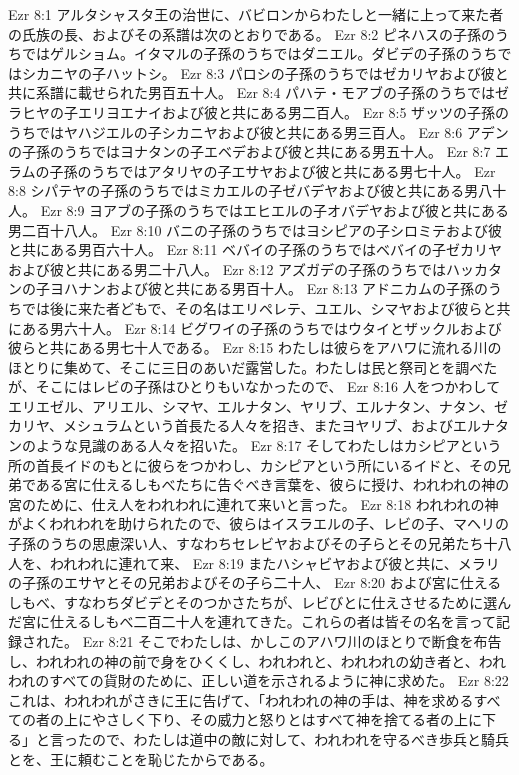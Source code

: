 Ezr 8:1  アルタシャスタ王の治世に、バビロンからわたしと一緒に上って来た者の氏族の長、およびその系譜は次のとおりである。
Ezr 8:2  ピネハスの子孫のうちではゲルショム。イタマルの子孫のうちではダニエル。ダビデの子孫のうちではシカニヤの子ハットシ。
Ezr 8:3  パロシの子孫のうちではゼカリヤおよび彼と共に系譜に載せられた男百五十人。
Ezr 8:4  パハテ・モアブの子孫のうちではゼラヒヤの子エリヨエナイおよび彼と共にある男二百人。
Ezr 8:5  ザッツの子孫のうちではヤハジエルの子シカニヤおよび彼と共にある男三百人。
Ezr 8:6  アデンの子孫のうちではヨナタンの子エベデおよび彼と共にある男五十人。
Ezr 8:7  エラムの子孫のうちではアタリヤの子エサヤおよび彼と共にある男七十人。
Ezr 8:8  シパテヤの子孫のうちではミカエルの子ゼバデヤおよび彼と共にある男八十人。
Ezr 8:9  ヨアブの子孫のうちではエヒエルの子オバデヤおよび彼と共にある男二百十八人。
Ezr 8:10  バニの子孫のうちではヨシピアの子シロミテおよび彼と共にある男百六十人。
Ezr 8:11  ベバイの子孫のうちではベバイの子ゼカリヤおよび彼と共にある男二十八人。
Ezr 8:12  アズガデの子孫のうちではハッカタンの子ヨハナンおよび彼と共にある男百十人。
Ezr 8:13  アドニカムの子孫のうちでは後に来た者どもで、その名はエリペレテ、ユエル、シマヤおよび彼らと共にある男六十人。
Ezr 8:14  ビグワイの子孫のうちではウタイとザックルおよび彼らと共にある男七十人である。
Ezr 8:15  わたしは彼らをアハワに流れる川のほとりに集めて、そこに三日のあいだ露営した。わたしは民と祭司とを調べたが、そこにはレビの子孫はひとりもいなかったので、
Ezr 8:16  人をつかわしてエリエゼル、アリエル、シマヤ、エルナタン、ヤリブ、エルナタン、ナタン、ゼカリヤ、メシュラムという首長たる人々を招き、またヨヤリブ、およびエルナタンのような見識のある人々を招いた。
Ezr 8:17  そしてわたしはカシピアという所の首長イドのもとに彼らをつかわし、カシピアという所にいるイドと、その兄弟である宮に仕えるしもべたちに告ぐべき言葉を、彼らに授け、われわれの神の宮のために、仕え人をわれわれに連れて来いと言った。
Ezr 8:18  われわれの神がよくわれわれを助けられたので、彼らはイスラエルの子、レビの子、マヘリの子孫のうちの思慮深い人、すなわちセレビヤおよびその子らとその兄弟たち十八人を、われわれに連れて来、
Ezr 8:19  またハシャビヤおよび彼と共に、メラリの子孫のエサヤとその兄弟およびその子ら二十人、
Ezr 8:20  および宮に仕えるしもべ、すなわちダビデとそのつかさたちが、レビびとに仕えさせるために選んだ宮に仕えるしもべ二百二十人を連れてきた。これらの者は皆その名を言って記録された。
Ezr 8:21  そこでわたしは、かしこのアハワ川のほとりで断食を布告し、われわれの神の前で身をひくくし、われわれと、われわれの幼き者と、われわれのすべての貨財のために、正しい道を示されるように神に求めた。
Ezr 8:22  これは、われわれがさきに王に告げて、「われわれの神の手は、神を求めるすべての者の上にやさしく下り、その威力と怒りとはすべて神を捨てる者の上に下る」と言ったので、わたしは道中の敵に対して、われわれを守るべき歩兵と騎兵とを、王に頼むことを恥じたからである。

